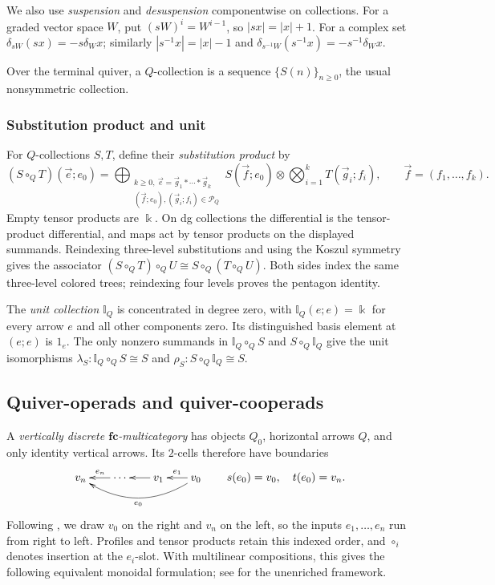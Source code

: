\documentclass[11pt,letterpaper]{article}
\numberwithin{equation}{section}
\theoremstyle{plain}
\theoremstyle{definition}
\theoremstyle{remark}
\begin{document}
We also use \textit{suspension} and \textit{desuspension} componentwise on collections.
For a graded vector space $W$, put $(sW)^i=W^{i-1}$, so
$|sx|=|x|+1$. For a complex set
$\delta_{sW}(sx)=-s\delta_Wx$; similarly
$|s^{-1}x|=|x|-1$ and
$\delta_{s^{-1}W}(s^{-1}x)=-s^{-1}\delta_Wx$.

Over the terminal quiver, a $Q$-collection is a sequence
$\{S(n)\}_{n\geq0}$, the usual nonsymmetric collection.


\subsubsection{Substitution product and unit}
\label{sss_substitution_product}
\label{sss_unit_collection}
For $Q$-collections $S,T$, define their \textit{substitution product} by
\begin{equation}\label{eq_S_1_circ_S_2}
 (S\circ_Q T)(\vec e;e_0)=
 \bigoplus_{\substack{k\geq0,\ \vec e=\vec g_1*\cdots*\vec g_k\\
 (\vec f;e_0),(\vec g_i;f_i)\in\mathcal P_Q}}
 S(\vec f;e_0)\otimes\bigotimes_{i=1}^k T(\vec g_i;f_i),
 \qquad \vec f=(f_1,\ldots,f_k).
\end{equation}
Empty tensor products are $\Bbbk$. On dg collections the differential
is the tensor-product differential, and maps act by tensor products
on the displayed summands. Reindexing three-level substitutions and
using the Koszul symmetry gives the associator
$(S\circ_Q T)\circ_Q U\cong S\circ_Q(T\circ_Q U)$.
Both sides index the same three-level colored trees; reindexing four
levels proves the pentagon identity.

The \textit{unit collection} $\mathbb I_Q$ is concentrated in degree zero, with
$\mathbb I_Q(e;e)=\Bbbk$ for every arrow $e$ and all other components zero.
Its distinguished basis element at $(e;e)$ is $1_e$.
The only nonzero summands in $\mathbb I_Q\circ_Q S$ and
$S\circ_Q\mathbb I_Q$ give the unit isomorphisms
$\lambda_S:\mathbb I_Q\circ_Q S\cong S$ and
$\rho_S:S\circ_Q\mathbb I_Q\cong S$.

\subsection{Quiver-operads and quiver-cooperads}
\label{ss_operad_over_graphs}
\label{s_fc_comulticategories}
\label{ss_augmentation_coaugmentation}
A \textit{vertically discrete $\mathbf{fc}$-multicategory} has objects $Q_0$,
horizontal arrows $Q$, and only identity vertical arrows. Its $2$-cells
therefore have boundaries
\begin{equation*} \xymatrix@C=18pt{
 v_n&\cdots\ar[l]_{e_n}&v_1\ar[l]&
 v_0\ar[l]_{e_1}\ar@/^18pt/[lll]^{e_0}}
 \qquad s(e_0)=v_0,\quad t(e_0)=v_n.
\end{equation*}
Following \cite[\S3.2]{Yuan_higher_operad_Fuk}, we draw $v_0$ on the right
and $v_n$ on the left, so the inputs $e_1,\ldots,e_n$ run from right to
left. Profiles and tensor products retain this indexed order, and
$\circ_i$ denotes insertion at the $e_i$-slot.
With multilinear compositions, this gives the following equivalent
monoidal formulation; see \cite{leinster1999fc,leinster2004higher,
cruttwell2009unified} for the unenriched framework.
\end{document}
